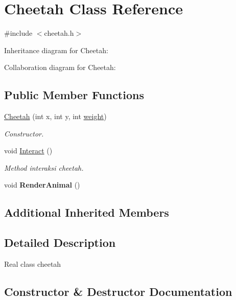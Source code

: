 \hypertarget{classCheetah}{}\section{Cheetah Class Reference}
\label{classCheetah}


{\ttfamily \#include $<$cheetah.\+h$>$}



Inheritance diagram for Cheetah\+:


Collaboration diagram for Cheetah\+:
\subsection*{Public Member Functions}
\begin{DoxyCompactItemize}
\item 
\hyperlink{classCheetah_aa8bec3ae2c2bb25535f805c0509a0e6b}{Cheetah} (int x, int y, int \hyperlink{classAnimal_a9a3b22f243f7109c57f36b3c660feb6e}{weight})
\begin{DoxyCompactList}\small\item\em Constructor. \end{DoxyCompactList}\item 
void \hyperlink{classCheetah_acccc555d58c53630b62490dd00d84306}{Interact} ()\hypertarget{classCheetah_acccc555d58c53630b62490dd00d84306}{}\label{classCheetah_acccc555d58c53630b62490dd00d84306}

\begin{DoxyCompactList}\small\item\em Method interaksi cheetah. \end{DoxyCompactList}\item 
void {\bfseries Render\+Animal} ()\hypertarget{classCheetah_aaec9d58dd6082bf56467343a3ef3b076}{}\label{classCheetah_aaec9d58dd6082bf56467343a3ef3b076}

\end{DoxyCompactItemize}
\subsection*{Additional Inherited Members}


\subsection{Detailed Description}
Real class cheetah 

\subsection{Constructor \& Destructor Documentation}
